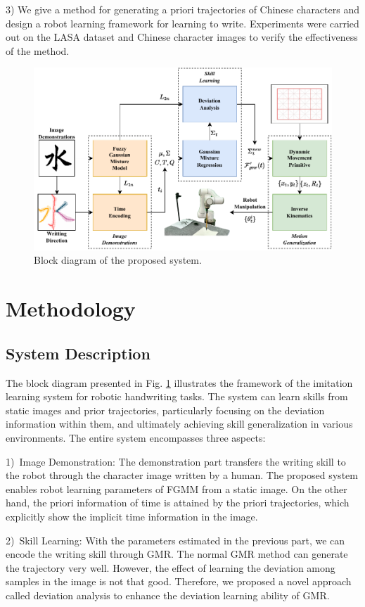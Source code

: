 \documentclass[journal]{IEEEtran}
\begin{document}
3) We give a method for generating a priori trajectories of Chinese characters and design a robot learning framework for learning to write. Experiments were carried out on the LASA dataset and Chinese character images to verify the effectiveness of the method.
\begin{figure}[!t]
    \centering
    \includegraphics[width=6in]{./fig/fig1.pdf}
    \caption{Block diagram of the proposed system.}
    \label{fig1}
\end{figure}

\section{Methodology}
\subsection{System Description}
The block diagram presented in Fig. \ref{fig1} illustrates the framework of the imitation learning system for robotic handwriting tasks. The system can learn skills from static images and prior trajectories, particularly focusing on the deviation information within them, and ultimately achieving skill generalization in various environments. The entire system encompasses three aspects:

1)~Image Demonstration: The demonstration part transfers the writing skill to the robot through the character image written by a human. The proposed system enables robot learning parameters of FGMM from a static image. On the other hand, the priori information of time is attained by the priori trajectories, which explicitly show the implicit time information in the image.

2)~Skill Learning: With the parameters estimated in the previous part, we can encode the writing skill through GMR. The normal GMR method can generate the trajectory very well. However, the effect of learning the deviation among samples in the image is not that good. Therefore, we proposed a novel approach called deviation analysis to enhance the deviation learning ability of GMR.
\end{document}
